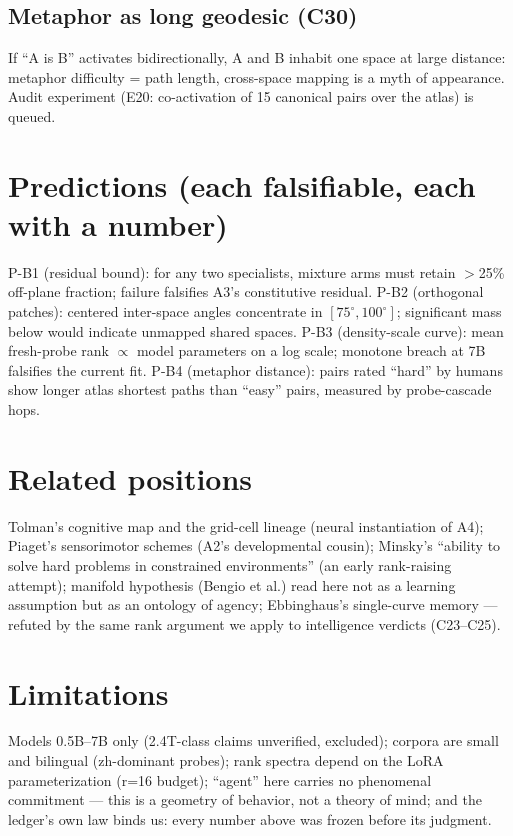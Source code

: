 \documentclass[11pt]{article}
\begin{document}
\subsection{Metaphor as long geodesic (C30)}
If ``A is B'' activates bidirectionally, A and B inhabit one space at large distance:
metaphor difficulty = path length, cross-space mapping is a myth of appearance.
Audit experiment (E20: co-activation of 15 canonical pairs over the atlas) is queued.

\section{Predictions (each falsifiable, each with a number)}
P-B1 (residual bound): for any two specialists, mixture arms must retain
$>$25\% off-plane fraction; failure falsifies A3's constitutive residual.
P-B2 (orthogonal patches): centered inter-space angles concentrate in
$[75^\circ,100^\circ]$; significant mass below would indicate unmapped shared spaces.
P-B3 (density-scale curve): mean fresh-probe rank $\propto$ model parameters on a
log scale; monotone breach at 7B falsifies the current fit.
P-B4 (metaphor distance): pairs rated ``hard'' by humans show longer atlas shortest
paths than ``easy'' pairs, measured by probe-cascade hops.

\section{Related positions}
Tolman's cognitive map and the grid-cell lineage (neural instantiation of A4);
Piaget's sensorimotor schemes (A2's developmental cousin); Minsky's
``ability to solve hard problems in constrained environments'' (an early
rank-raising attempt); manifold hypothesis (Bengio et al.) read here not as a
learning assumption but as an ontology of agency; Ebbinghaus's single-curve memory
--- refuted by the same rank argument we apply to intelligence verdicts (C23--C25).

\section{Limitations}
Models 0.5B--7B only (2.4T-class claims unverified, excluded); corpora are small and
bilingual (zh-dominant probes); rank spectra depend on the LoRA parameterization
(r=16 budget); ``agent'' here carries no phenomenal commitment --- this is a geometry
of behavior, not a theory of mind; and the ledger's own law binds us: every number
above was frozen before its judgment.
\end{document}

